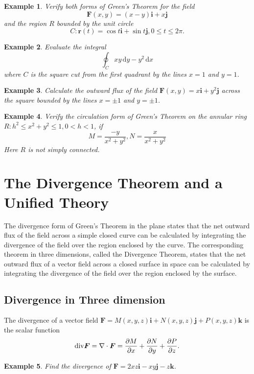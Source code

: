 \documentclass[a4paper,12pt]{article}
\newtheorem{example}{Example}             %
\begin{document}
\begin{CJK}{UTF8}{gbsn}
\begin{example}
    Verify both forms of Green's Theorem for the field 
    \[
        \bm{F}(x,y) = (x-y)\bm{i} + x\bm{j}
    \]
    and the region $R$ bounded by the unit circle 
    \[
        C: \bm{r}(t) = \cos t\bm{i} + \sin t\bm{j}, 0 \le t \le 2\pi.
    \]
\end{example}
\begin{example}
    Evaluate the integral 
    \[
        \oint_C xy\,\mathrm{d}y - y^2\,\mathrm{d}x
    \]
    where $C$ is the square cut from the first quadrant by the lines 
    $x = 1$ and $y = 1$.
\end{example}

\begin{example}
    Calculate the outward flux of the field $\bm{F}(x,y) = x\bm{i} + y^2\bm{j}$
    across the square bounded by the lines $x = \pm 1$ and $y = \pm 1$.
\end{example}

\begin{example}
    Verify the circulation form of Green's Theorem on the annular ring 
    $R:h^2 \le x^2 + y^2 \le 1, 0 < h < 1$, if 
    \[
        M = \frac{-y}{x^2+y^2}, N = \frac{x}{x^2 + y^2}
    \]
    Here $R$ is not simply connected.
\end{example}

\section{The Divergence Theorem and a Unified Theory}
The divergence form of Green's Theorem in the plane states that 
the net outward flux of the field across a simple closed curve 
can be calculated by integrating the divergence of the field over 
the region enclosed by the curve. The corresponding theorem 
in three dimensions, called the Divergence Theorem, states that
the net outward flux of a vector field across a closed surface in 
space can be calculated by integrating the divergence of the field 
over the region enclosed by the surface.

\subsection{Divergence in Three dimension}
The divergence of a vector field $\bm{F} = M(x,y,z)\bm{i} + N(x,y,z)\bm{j}
+ P(x,y,z)\bm{k}$ is the scalar function 
\[
    {\rm div} \bm{F} = \nabla\cdot\bm{F} = \frac{\partial M}{\partial x} 
    + \frac{\partial N}{\partial y} + \frac{\partial P}{\partial z}.
\]
\begin{example}
    Find the divergence of $\bm{F} = 2xz\bm{i} - xy\bm{j} -z \bm{k}$.
\end{example}


\end{CJK}
\end{document}
